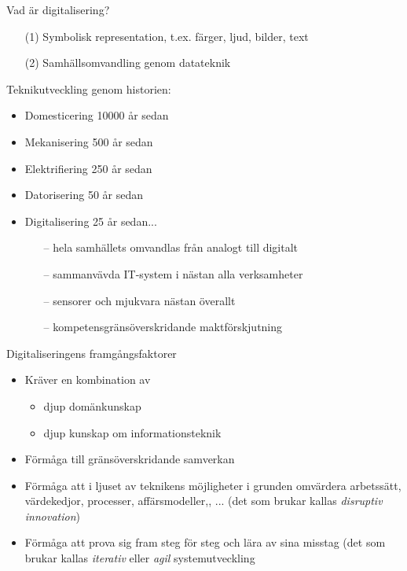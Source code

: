 \documentclass[aspectratio=169]{beamer}
\newenvironment{Slide}[1]%
  {\begin{frame}[environment=Slide]{#1}}
  {\end{frame}}%
\begin{document}
\begin{Slide}{Vad är digitalisering?}
  \begin{itemize}
    \item[(1)] Symbolisk representation, t.ex. färger, ljud, bilder, text
    \item[(2)] Samhällsomvandling genom datateknik
  \end{itemize}
  \pause
  \vspace{1em}
  Teknikutveckling genom historien:
  \begin{itemize}
    \item Domesticering  \hfill 10000 år sedan
    \item Mekanisering \hfill 500 år sedan
    \item Elektrifiering \hfill 250 år sedan
    \item Datorisering \hfill 50 år sedan
    \item Digitalisering  \pause\hfill 25 år sedan... \hfill
    \begin{itemize}
      \item[] -- hela samhällets omvandlas från analogt till digitalt
      \item[] -- sammanvävda IT-system i nästan alla verksamheter
      \item[] -- sensorer och mjukvara nästan överallt
      \item[] -- kompetensgränsöverskridande maktförskjutning
    \end{itemize}
  \end{itemize}
  \end{Slide}
  


\begin{Slide}{Digitaliseringens framgångsfaktorer}
  \begin{itemize}
    \item Kräver en kombination av
    \begin{itemize}
      \item djup domänkunskap
      \item djup kunskap om informationsteknik
    \end{itemize}
    \item Förmåga till gränsöverskridande samverkan
    \item Förmåga att i ljuset av teknikens möjligheter i grunden omvärdera arbetssätt, värdekedjor, processer, affärsmodeller,, ... (det som brukar kallas \emph{disruptiv innovation})
    \item Förmåga att prova sig fram steg för steg och lära av sina misstag (det som brukar kallas \emph{iterativ} eller \emph{agil} systemutveckling
  \end{itemize}
  
\end{Slide}
\end{document}
